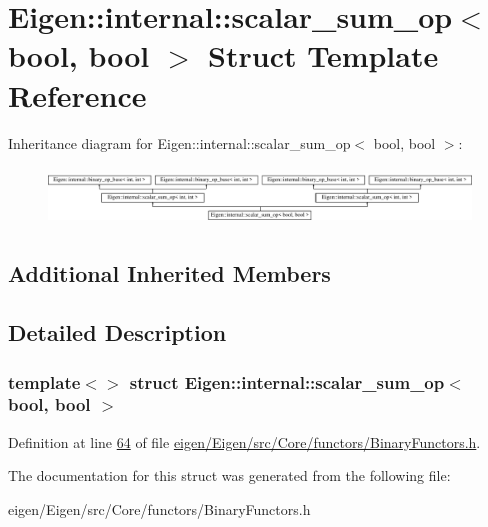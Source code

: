 \hypertarget{struct_eigen_1_1internal_1_1scalar__sum__op_3_01bool_00_01bool_01_4}{}\section{Eigen\+:\+:internal\+:\+:scalar\+\_\+sum\+\_\+op$<$ bool, bool $>$ Struct Template Reference}
\label{struct_eigen_1_1internal_1_1scalar__sum__op_3_01bool_00_01bool_01_4}
Inheritance diagram for Eigen\+:\+:internal\+:\+:scalar\+\_\+sum\+\_\+op$<$ bool, bool $>$\+:\begin{figure}[H]
\begin{center}
\leavevmode
\includegraphics[height=1.544118cm]{struct_eigen_1_1internal_1_1scalar__sum__op_3_01bool_00_01bool_01_4}
\end{center}
\end{figure}
\subsection*{Additional Inherited Members}


\subsection{Detailed Description}
\subsubsection*{template$<$$>$\newline
struct Eigen\+::internal\+::scalar\+\_\+sum\+\_\+op$<$ bool, bool $>$}



Definition at line \hyperlink{eigen_2_eigen_2src_2_core_2functors_2_binary_functors_8h_source_l00064}{64} of file \hyperlink{eigen_2_eigen_2src_2_core_2functors_2_binary_functors_8h_source}{eigen/\+Eigen/src/\+Core/functors/\+Binary\+Functors.\+h}.



The documentation for this struct was generated from the following file\+:\begin{DoxyCompactItemize}
\item 
eigen/\+Eigen/src/\+Core/functors/\+Binary\+Functors.\+h\end{DoxyCompactItemize}
